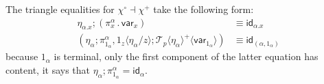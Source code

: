 \documentclass[10pt]{article}
\theoremstyle{definition}
\newcommand\TrPlus[2]{\ensuremath{{#1}^+(#2)}}
\newcommand\TrCirc[2]{\ensuremath{{#1}^\circ(#2)}}
\newcommand\var[1]{\ensuremath{\mathsf{var}_{#1}}}
\newcommand{\id}{\mathsf{id}}
\newcommand\ApEl[2]{\mathcal{T}_{#1}\langle#2\rangle}
\newcommand\ap[2]{\ensuremath{#1 \langle #2 \rangle }}
\newcommand\bdot[0]{\mathbin{.}}
\begin{document}
\noindent The triangle equalities for $\chi^\circ \dashv \chi^+$ take the following form:
\begin{align*}
\eta_{\alpha.x};(\pi_x^\alpha \bdot \var{x}) &\equiv \id_{\alpha.x} \\
(\eta_\alpha ; \pi^\alpha_{1_\alpha}, \ap{1_z}{\eta_\alpha/z} ; \ap{\ApEl{p}{\eta_\alpha}^+}{\var{1_\alpha}}) &\equiv \id_{(\alpha, 1_\alpha)}
\end{align*}
because $1_\alpha$ is terminal, only the first component of the latter equation has content, it says that $\eta_\alpha ; \pi^\alpha_{1_\alpha} = \id_\alpha$.

\end{document}
